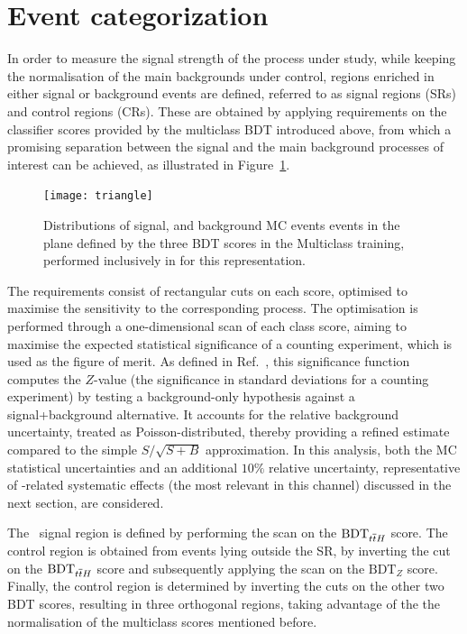 \section{Event categorization}
\label{sec:tth_categories}

In order to measure the signal strength of the process under study, while keeping the normalisation of the main backgrounds under control, regions enriched in either signal or background events are defined, referred to as signal regions (SRs) and control regions (CRs). These are obtained by applying requirements on the classifier scores provided by the multiclass BDT introduced above, from which a promising separation between the signal and the main background processes of interest can be achieved, as illustrated in Figure~\ref{fig:triangle}.

\begin{figure}[htbp]
  \centering
  \texttt{[image: triangle]}
  \caption{Distributions of signal, \ztautau and \ttbar background MC events events in the plane defined by the three BDT scores in the Multiclass training, performed inclusively in \pth for this representation.}
  \label{fig:triangle}
\end{figure}

The requirements consist of rectangular cuts on each score, optimised to maximise the sensitivity to the corresponding process. The optimisation is performed through a one-dimensional scan of each class score, aiming to maximise the expected statistical significance of a counting experiment, which is used as the figure of merit. As defined in Ref.~\cite{ATL-PHYS-PUB-2020-025}, this significance function computes the $Z$-value (the significance in standard deviations for a counting experiment) by testing a background-only hypothesis against a signal+background alternative. It accounts for the relative background uncertainty, treated as Poisson-distributed, thereby providing a refined estimate compared to the simple $S/\sqrt{S+B}$ approximation. In this analysis, both the MC statistical uncertainties and an additional $10\%$ relative uncertainty, representative of \ttbar-related systematic effects (the most relevant in this channel) discussed in the next section, are considered.

The \ttH\ signal region is defined by performing the scan on the $\text{BDT}_{\text{\ensuremath{t\overline{t}H}}}$ score. The \ztautau control region is obtained from events lying outside the \ttH SR, by inverting the cut on the $\text{BDT}_{\text{\ensuremath{t\overline{t}H}}}$ score and subsequently applying the scan on the $\text{BDT}_{Z}$ score. Finally, the \ttbar control region is determined by inverting the cuts on the other two BDT scores, resulting in three orthogonal regions, taking advantage of the the normalisation of the multiclass scores mentioned before.

